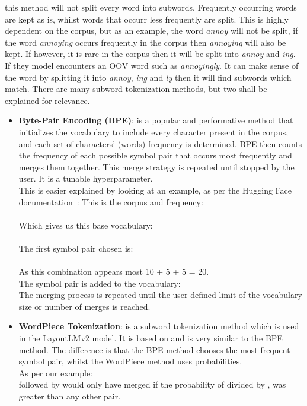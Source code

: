 \begin{itemize}
	      this method will not split every word into subwords. Frequently occurring words are kept as is, whilst words that occurr less frequently
	      are split. This is highly dependent on the corpus, but as an example, the word \emph{annoy} will not be split, if the word \emph{annoying}
	      occurs frequently in the corpus then \emph{annoying} will also be kept. If however, it is rare in the corpus then it will be split
	      into \emph{annoy} and \emph{ing}. If they model encounters an OOV word such as \emph{annoyingly}. It can make sense of the word by splitting it
	      into \emph{annoy}, \emph{ing} and \emph{ly} then it will find subwords which match.
	      \bigbreak
	      There are many subword tokenization methods, but two shall be explained for relevance.
	      \begin{itemize}
		      \item \textbf{Byte-Pair Encoding (BPE)}: is a popular and performative method that initializes the vocabulary to include
		            every character present in the corpus, and each set of characters' (words) frequency is determined.
		            BPE then counts the frequency of each possible symbol pair that occurs most frequently and merges
		            them together. This merge strategy is repeated until stopped by the user. It is a tunable hyperparameter.\\
		            This is easier explained by looking at an example, as per the Hugging Face documentation~\autocite{SummaryTokenizers}:
		            \bigbreak
		            This is the corpus and frequency:\\
		            \\
		            Which gives us this base vocabulary:\\
		            \code{["b", "g", "h", "n", "p", "s", "u"]}\\
		            The first symbol pair chosen is: \\
		            \\
		            As this combination appears most 10 + 5 + 5 = 20.\\
		            The symbol pair is added to the vocabulary: \\
		            \code{["b", "g", "h", "n", "p", "s", "u", "ug"]}
		            \bigbreak
		            The merging process is repeated until the user defined limit of the vocabulary size or number of merges is reached.
		      \item \textbf{WordPiece Tokenization}: is a subword tokenization method which is used in the LayoutLMv2 model. It is based on and is very similar to
		            the BPE method. The difference is that the BPE method chooses the most frequent symbol pair, whilst the WordPiece method uses probabilities.\\
		            As per our example:\\
		             followed by  would only have merged if the probability of  divided by ,  was greater
		            than any other pair.
	      \end{itemize}
\end{itemize}
